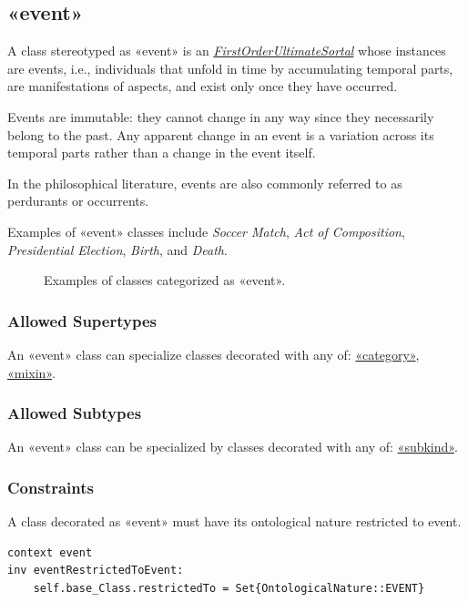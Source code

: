 \subsection{«event»}
\label{stereotype:event}

A class stereotyped as «event» is an \hyperref[stereotype:firstOrderUltimateSortal]{\textit{FirstOrderUltimateSortal}} whose instances are events, i.e., individuals that unfold in time by accumulating temporal parts, are manifestations of aspects, and exist only once they have occurred.

Events are immutable: they cannot change in any way since they necessarily belong to the past. Any apparent change in an event is a variation across its temporal parts rather than a change in the event itself. 

In the philosophical literature, events are also commonly referred to as perdurants or occurrents.

Examples of «event» classes include \textit{Soccer Match}, \textit{Act of Composition}, \textit{Presidential Election}, \textit{Birth}, and \textit{Death}.

\begin{figure}[h]
    \centering
    
    \caption{Examples of classes categorized as «event».}
    \label{fig:event-example}
\end{figure}

\subsubsection{Allowed Supertypes}

An «event» class can specialize classes decorated with any of: 
\hyperref[stereotype:category]{«category»}, \hyperref[stereotype:mixin]{«mixin»}.

\subsubsection{Allowed Subtypes}

An «event» class can be specialized by classes decorated with any of:
\hyperref[stereotype:subkind]{«subkind»}.

\subsubsection{Constraints}

\begin{constraint}
\label{constraint:eventRestrictedToEvent}
A class decorated as «event» must have its ontological nature restricted to event.

\begin{lstlisting}[language=OCL]
context event 
inv eventRestrictedToEvent:
    self.base_Class.restrictedTo = Set{OntologicalNature::EVENT}
\end{lstlisting}
\end{constraint}

